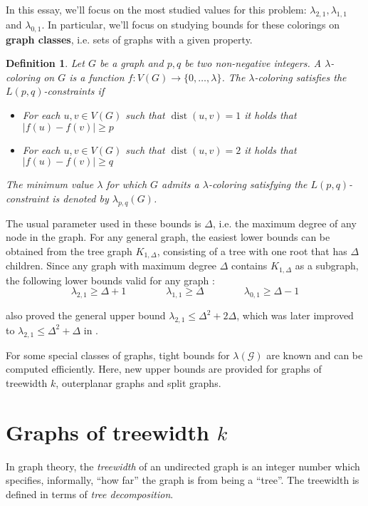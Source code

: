 \documentclass[12pt,a4paper]{article}
\newtheorem{definition}{Definition}
\newcommand{\curlyquotes}[1]{\textquotedblleft #1\textquotedblright}
\newcommand{\abs}[1]{\left|#1\right|}
\DeclareMathOperator{\dist}{dist}
\begin{document}
    In this essay, we'll focus on the most studied values for this problem: $\lambda_{2,1}, \lambda_{1,1}$ and $\lambda_{0,1}$. In particular, we'll focus on studying bounds for these colorings on \textbf{graph classes}, i.e. sets of graphs with a given property.

    \begin{definition}
      Let $G$ be a graph and $p,q$ be two non-negative integers. A $\lambda$-coloring on $G$ is a function $f : V(G) \to \{0, \ldots , \lambda\}$. The $\lambda$-coloring satisfies the $L(p, q)$-constraints if
      \begin{itemize}
        \item For each $u,v \in V(G)$ such that $\dist(u,v) = 1$ it holds that $\abs{f(u) - f(v)} \geq p$
        \item For each $u,v \in V(G)$ such that $\dist(u,v) = 2$ it holds that $\abs{f(u) - f(v)} \geq q$
      \end{itemize}
      The minimum value $\lambda$ for which $G$ admits a $\lambda$-coloring satisfying the $L(p,q)$-constraint is denoted by $\lambda_{p,q}(G)$.
    \end{definition}

    The usual parameter used in these bounds is $\Delta$, i.e. the maximum degree of any node in the graph. For any general graph, the easiest lower bounds can be obtained from the tree graph $K_{1,\Delta}$, consisting of a tree with one root that has $\Delta$ children. Since any graph with maximum degree $\Delta$ contains $K_{1,\Delta}$ as a subgraph, the following lower bounds valid for any graph \cite{L21_color,lower_L01}:
    \[\lambda_{2,1} \geq \Delta+1 \qquad\qquad \lambda_{1,1} \geq \Delta \qquad\qquad \lambda_{0,1} \geq \Delta-1\]

    \cite{L21_color} also proved the general upper bound $\lambda_{2,1} \leq \Delta^2+2\Delta$, which was later improved to $\lambda_{2,1} \leq \Delta^2+\Delta$ in \cite{upper_L21}.

    For some special classes of graphs, tight bounds for $\lambda(\mathcal{G})$ are known and can be computed efficiently. Here, new upper bounds are provided for graphs of treewidth $k$, outerplanar graphs and split graphs.

    \section{Graphs of treewidth $k$}

    In graph theory, the \textit{treewidth} of an undirected graph is an integer number which specifies, informally, \curlyquotes{how far} the graph is from being a \curlyquotes{tree}. The treewidth is defined in terms of \textit{tree decomposition}.
\end{document}
